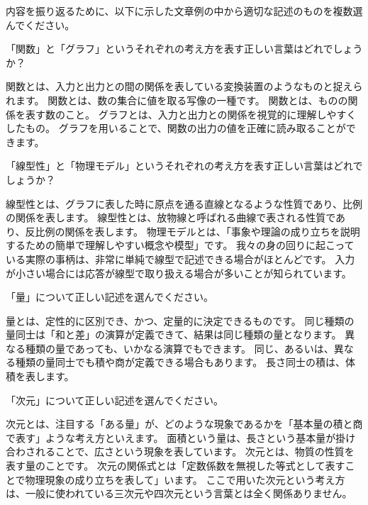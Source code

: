 \documentclass[uplatex,dvipdfmx,a4paper,11pt]{jsreport}
\begin{document}
\newpage

内容を振り返るために、以下に示した文章例の中から適切な記述のものを複数選んでください。
\begin{qlist}
	\qitem 「関数」と「グラフ」というそれぞれの考え方を表す正しい言葉はどれでしょうか？
		\begin{qlist2}
			\qitem 関数とは、入力と出力との間の関係を表している変換装置のようなものと捉えられます。
			\qitem 関数とは、数の集合に値を取る写像の一種です。
			\qitem 関数とは、ものの関係を表す数のこと。
			\qitem グラフとは、入力と出力との関係を視覚的に理解しやすくしたもの。
			\qitem グラフを用いることで、関数の出力の値を正確に読み取ることができます。
		\end{qlist2}
    \vspace{3mm}
	\qitem 「線型性」と「物理モデル」というそれぞれの考え方を表す正しい言葉はどれでしょうか？
		\begin{qlist2}
			\qitem 線型性とは、グラフに表した時に原点を通る直線となるような性質であり、比例の関係を表します。
			\qitem 線型性とは、放物線と呼ばれる曲線で表される性質であり、反比例の関係を表します。
			\qitem 物理モデルとは、「事象や理論の成り立ちを説明するための簡単で理解しやすい概念や模型」です。
			\qitem 我々の身の回りに起こっている実際の事柄は、非常に単純で線型で記述できる場合がほとんどです。
			\qitem 入力が小さい場合には応答が線型で取り扱える場合が多いことが知られています。
    \end{qlist2}
    \vspace{3mm}
	\qitem 「量」について正しい記述を選んでください。
		\begin{qlist2}
			\qitem 量とは、定性的に区別でき、かつ、定量的に決定できるものです。
			\qitem 同じ種類の量同士は「和と差」の演算が定義できて、結果は同じ種類の量となります。
			\qitem 異なる種類の量であっても、いかなる演算でもできます。
			\qitem 同じ、あるいは、異なる種類の量同士でも積や商が定義できる場合もあります。
			\qitem 長さ同士の積は、体積を表します。
    \end{qlist2}
    \vspace{3mm}
	\qitem 「次元」について正しい記述を選んでください。
		\begin{qlist2}
			\qitem 次元とは、注目する「ある量」が、どのような現象であるかを「基本量の積と商で表す」ような考え方といえます。
			\qitem 面積という量は、長さという基本量が掛け合わされることで、広さという現象を表しています。
			\qitem 次元とは、物質の性質を表す量のことです。
			\qitem 次元の関係式とは「定数係数を無視した等式として表すことで物理現象の成り立ちを表して」います。
			\qitem ここで用いた次元という考え方は、一般に使われている三次元や四次元という言葉とは全く関係ありません。

\end{qlist2}
\end{qlist}
\end{document}
